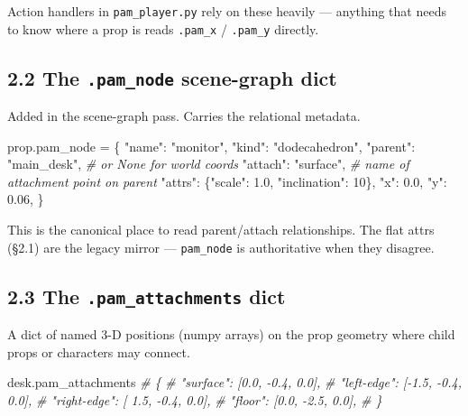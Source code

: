 \documentclass[
  11pt,
]{book}
\newenvironment{Shaded}{}{}
\newcommand{\CommentTok}[1]{\textcolor[rgb]{0.38,0.63,0.69}{\textit{#1}}}
\newcommand{\DecValTok}[1]{\textcolor[rgb]{0.25,0.63,0.44}{#1}}
\newcommand{\FloatTok}[1]{\textcolor[rgb]{0.25,0.63,0.44}{#1}}
\newcommand{\NormalTok}[1]{#1}
\newcommand{\OperatorTok}[1]{\textcolor[rgb]{0.40,0.40,0.40}{#1}}
\newcommand{\StringTok}[1]{\textcolor[rgb]{0.25,0.44,0.63}{#1}}
\begin{document}
Action handlers in \texttt{pam\_player.py} rely on these heavily ---
anything that needs to know where a prop is reads \texttt{.pam\_x} /
\texttt{.pam\_y} directly.

\subsection{\texorpdfstring{2.2 The \texttt{.pam\_node} scene-graph
dict}{2.2 The .pam\_node scene-graph dict}}\label{the-.pam_node-scene-graph-dict}

Added in the scene-graph pass. Carries the relational metadata.

\begin{Shaded}
\begin{Highlighting}[]
\NormalTok{prop.pam\_node }\OperatorTok{=}\NormalTok{ \{}
    \StringTok{"name"}\NormalTok{:   }\StringTok{"monitor"}\NormalTok{,}
    \StringTok{"kind"}\NormalTok{:   }\StringTok{"dodecahedron"}\NormalTok{,}
    \StringTok{"parent"}\NormalTok{: }\StringTok{"main\_desk"}\NormalTok{,     }\CommentTok{\# or None for world coords}
    \StringTok{"attach"}\NormalTok{: }\StringTok{"surface"}\NormalTok{,       }\CommentTok{\# name of attachment point on parent}
    \StringTok{"attrs"}\NormalTok{:  \{}\StringTok{"scale"}\NormalTok{: }\FloatTok{1.0}\NormalTok{, }\StringTok{"inclination"}\NormalTok{: }\DecValTok{10}\NormalTok{\},}
    \StringTok{"x"}\NormalTok{:      }\FloatTok{0.0}\NormalTok{,}
    \StringTok{"y"}\NormalTok{:      }\FloatTok{0.06}\NormalTok{,}
\NormalTok{\}}
\end{Highlighting}
\end{Shaded}

This is the canonical place to read parent/attach relationships. The
flat attrs (§2.1) are the legacy mirror --- \texttt{pam\_node} is
authoritative when they disagree.

\subsection{\texorpdfstring{2.3 The \texttt{.pam\_attachments}
dict}{2.3 The .pam\_attachments dict}}\label{the-.pam_attachments-dict}

A dict of named 3-D positions (numpy arrays) on the prop geometry where
child props or characters may connect.

\begin{Shaded}
\begin{Highlighting}[]
\NormalTok{desk.pam\_attachments}
\CommentTok{\# \{}
\CommentTok{\#   "surface":    [0.0, {-}0.4, 0.0],}
\CommentTok{\#   "left{-}edge":  [{-}1.5, {-}0.4, 0.0],}
\CommentTok{\#   "right{-}edge": [ 1.5, {-}0.4, 0.0],}
\CommentTok{\#   "floor":      [0.0, {-}2.5, 0.0],}
\CommentTok{\# \}}
\end{Highlighting}
\end{Shaded}
\end{document}
